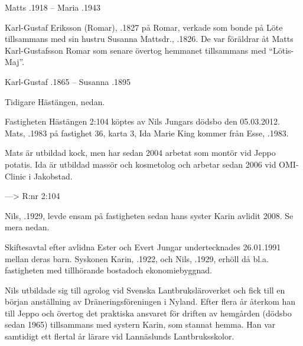 Matts .1918  --  Maria .1943



Karl-Gustaf Eriksson (Romar), .1827 på Romar, verkade som bonde på Löte tillsammans med sin hustru Susanna Mattsdr., .1826. De var föräldrar åt Matts Karl-Gustafsson Romar som senare övertog hemmanet tillsammans med ``Lötis-Maj''.

Karl-Gustaf .1865  --  Susanna .1895


Tidigare Hästängen, nedan.




Fastigheten Hästängen 2:104 köptes av Nils Jungars dödsbo den 05.03.2012. Mats, .1983 på fastighet 36, karta 3, Ida Marie King kommer från Esse, .1983.

Mats är utbildad kock, men har sedan 2004 arbetat som montör vid Jeppo potatis. Ida är utbildad massör och kosmetolog och arbetar sedan 2006 vid OMI-Clinic i Jakobstad.
\begin{jhchildren}
  \item {}
  \item {}
  \item {}
\end{jhchildren}

--->  R:nr 2:104


Nils, .1929, levde ensam på fastigheten sedan hans syster Karin avlidit 2008. Se mera nedan.


Skiftesavtal efter avlidna Ester och Evert Jungar undertecknades 26.01.1991 mellan deras barn. Syskonen Karin, .1922, och Nils, .1929, erhöll då bl.a. fastigheten med tillhörande bostadoch ekonomiebyggnad.

Nils utbildade sig till agrolog vid Svenska Lantbruksläroverket och fick till en början anställning av Dräneringsföreningen  i Nyland. Efter
flera år återkom han till Jeppo och övertog det praktiska ansvaret för driften av hemgården (dödsbo sedan 1965) tillsammans med systern Karin, som stannat hemma. Han var samtidigt ett flertal år lärare vid Lannäslunds Lantbruksskolor.

